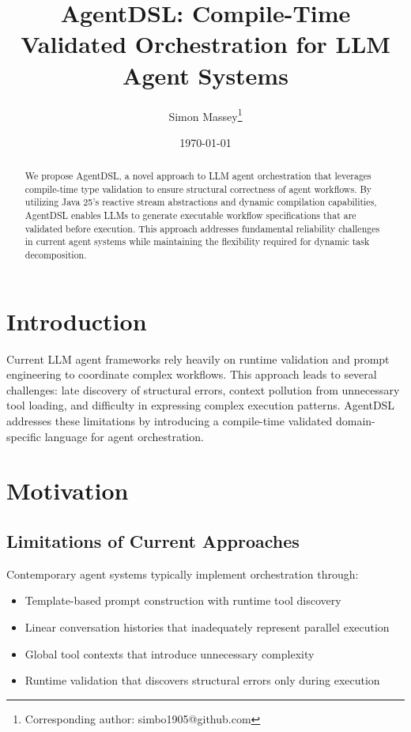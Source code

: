 \documentclass[11pt,a4paper]{article}
\title{AgentDSL: Compile-Time Validated Orchestration for LLM Agent Systems}
\author{Simon Massey\thanks{Corresponding author: simbo1905@github.com}}
\date{\today}
\begin{document}
\maketitle

\begin{abstract}
We propose AgentDSL, a novel approach to LLM agent orchestration that leverages compile-time type validation to ensure structural correctness of agent workflows. By utilizing Java 25's reactive stream abstractions and dynamic compilation capabilities, AgentDSL enables LLMs to generate executable workflow specifications that are validated before execution. This approach addresses fundamental reliability challenges in current agent systems while maintaining the flexibility required for dynamic task decomposition.
\end{abstract}

\section{Introduction}

Current LLM agent frameworks rely heavily on runtime validation and prompt engineering to coordinate complex workflows. This approach leads to several challenges: late discovery of structural errors, context pollution from unnecessary tool loading, and difficulty in expressing complex execution patterns. AgentDSL addresses these limitations by introducing a compile-time validated domain-specific language for agent orchestration.

\section{Motivation}

\subsection{Limitations of Current Approaches}

Contemporary agent systems typically implement orchestration through:
\begin{itemize}
    \item Template-based prompt construction with runtime tool discovery
    \item Linear conversation histories that inadequately represent parallel execution
    \item Global tool contexts that introduce unnecessary complexity
    \item Runtime validation that discovers structural errors only during execution
\end{itemize}
\end{document}
